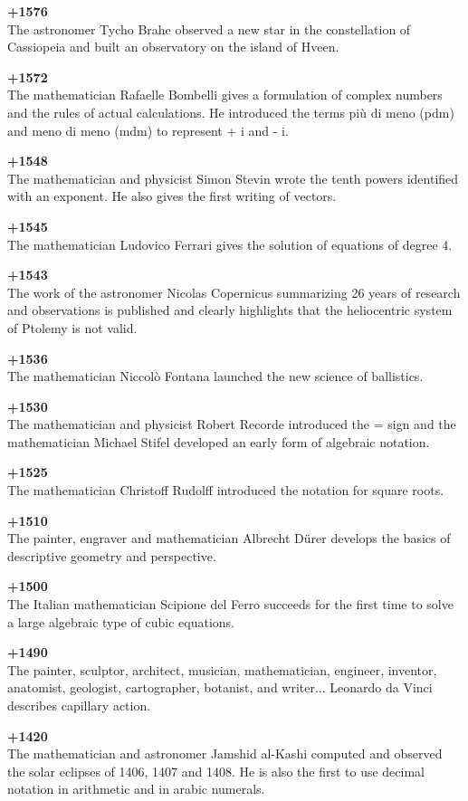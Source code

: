 \textbf{+1576}\\
The astronomer Tycho Brahe observed a new star in the constellation of Cassiopeia and built an observatory on the island of Hveen.

\textbf{+1572}\\
The mathematician Rafaelle Bombelli gives a formulation of complex numbers and the rules of actual calculations. He introduced the terms più di meno (pdm) and meno di meno (mdm) to represent + i and - i.

\textbf{+1548}\\
The mathematician and physicist Simon Stevin wrote the tenth powers identified with an exponent. He also gives the first writing of vectors. 

\textbf{+1545}\\
The mathematician Ludovico Ferrari gives the solution of equations of degree 4.

\textbf{+1543}\\
The work of the astronomer Nicolas Copernicus summarizing 26 years of research and observations is published and clearly highlights that the heliocentric system of Ptolemy is not valid.

\textbf{+1536}\\
The mathematician Niccolò Fontana launched the new science of ballistics.

\textbf{+1530}\\
The mathematician and physicist Robert Recorde introduced the = sign and the mathematician Michael Stifel developed an early form of algebraic notation.

\textbf{+1525}\\
The mathematician Christoff Rudolff introduced the notation for square roots.

\textbf{+1510}\\
The painter, engraver and mathematician Albrecht Dürer develops the basics of descriptive geometry and perspective.

\textbf{+1500}\\
The Italian mathematician Scipione del Ferro succeeds for the first time to solve a large algebraic type of cubic equations.

\textbf{+1490}\\
The painter, sculptor, architect, musician, mathematician, engineer, inventor, anatomist, geologist, cartographer, botanist, and writer... Leonardo da Vinci describes capillary action.

\textbf{+1420}\\
The mathematician and astronomer Jamshid al-Kashi computed and observed the solar eclipses of 1406, 1407 and 1408. He is also the first to use decimal notation in arithmetic and in arabic numerals.

